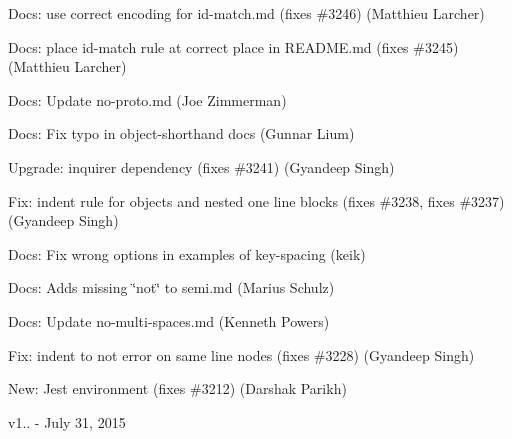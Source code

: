 \begin{DoxyItemize}
\item Docs\+: use correct encoding for id-\/match.\+md (fixes \#3246) (Matthieu Larcher)
\item Docs\+: place id-\/match rule at correct place in R\+E\+A\+D\+M\+E.\+md (fixes \#3245) (Matthieu Larcher)
\item Docs\+: Update no-\/proto.\+md (Joe Zimmerman)
\item Docs\+: Fix typo in object-\/shorthand docs (Gunnar Lium)
\item Upgrade\+: inquirer dependency (fixes \#3241) (Gyandeep Singh)
\item Fix\+: {\ttfamily indent} rule for objects and nested one line blocks (fixes \#3238, fixes \#3237) (Gyandeep Singh)
\item Docs\+: Fix wrong options in examples of key-\/spacing (keik)
\item Docs\+: Adds missing \char`\"{}not\char`\"{} to semi.\+md (Marius Schulz)
\item Docs\+: Update no-\/multi-\/spaces.\+md (Kenneth Powers)
\item Fix\+: {\ttfamily indent} to not error on same line nodes (fixes \#3228) (Gyandeep Singh)
\item New\+: Jest environment (fixes \#3212) (Darshak Parikh)
\end{DoxyItemize}

v1.. -\/ July 31, 2015


